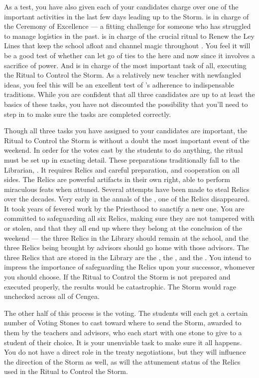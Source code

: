 \documentclass[char]{GL2020}
\begin{document}
As a test, you have also given each of your candidates charge over one of the important activities in the last few days leading up to the Storm. \cMusic{} is in charge of the Ceremony of Excellence — a fitting challenge for someone who has struggled to manage logistics in the past. \cBeetle{} is in charge of the crucial ritual to Renew the Ley Lines that keep the school afloat and channel magic throughout \pEarth{}. You feel it will be a good test of whether \cBeetle{\they} can let go of \cBeetle{\their} ties to the here and now since it involves a sacrifice of power. And \cChupSecond{} is in charge of the most important task of all, executing the Ritual to Control the Storm. As a relatively new teacher with newfangled ideas, you feel this will be an excellent test of \cChupSecond{}’s adherence to indispensable traditions. While you are confident that all three candidates are up to at least the basics of these tasks, you have not discounted the possibility that you'll need to step in to make sure the tasks are completed correctly.

Though all three tasks you have assigned to your candidates are important, the Ritual to Control the Storm is without a doubt the most important event of the weekend. In order for the votes cast by the students to do anything, the ritual must be set up in exacting detail. These preparations traditionally fall to the Librarian, \cLibrarian{\full}. It requires Relics and careful preparation, and cooperation on all sides. The Relics are powerful artifacts in their own right, able to perform miraculous feats when attuned. Several attempts have been made to steal Relics over the decades. Very early in the annals of the \pSc{}, one of the \pFarm{} Relics disappeared. It took years of fevered work by the Priesthood to sanctify a new one. You are committed to safeguarding all six Relics, making sure they are not tampered with or stolen, and that they all end up where they belong at the conclusion of the weekend — the three Relics in the Library should remain at the school, and the three Relics being brought by advisors should go home with those advisors. The three Relics that are stored in the Library are the \iNet{}, the \iLariat{}, and the \iScythe{}. You intend to impress the importance of safeguarding the Relics upon your successor, whomever you should choose. If the Ritual to Control the Storm is not prepared and executed properly, the results would be catastrophic. The Storm would rage unchecked across all of Cengea.

The other half of this process is the voting. The students will each get a certain number of Voting Stones to cast toward where to send the Storm, awarded to them by the teachers and advisors, who each start with one stone to give to a student of their choice. It is your unenviable task to make sure it all happens. You do not have a direct role in the treaty negotiations, but they will influence the direction of the Storm as well, as will the attunement status of the Relics used in the Ritual to Control the Storm. 
\end{document}
